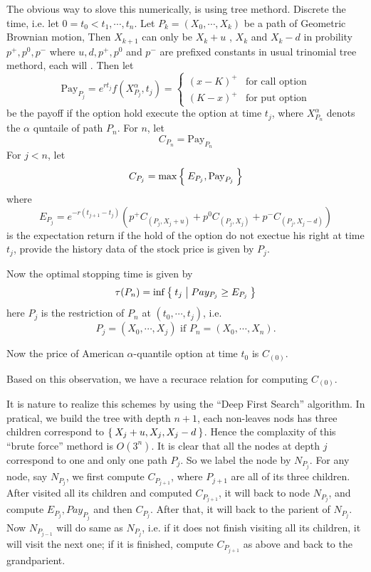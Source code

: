 \documentclass[11pt]{book}
\begin{document}
The obvious way to slove this numerically, is using tree methord. 
Discrete the time, i.e. let $0=t_0< t_1, \cdots, t_n$.
Let $P_k=(X_0, \cdots, X_k)$ be a path of Geometric Brownian motion, 
Then $X_{k+1}$ can only be $X_{k}+u$ , $X_k$ and $X_{k}-d$ in probility
$p^+,p^0,p^-$  where $u,d,p^+,p^0$ and $p^-$ are prefixed 
constants in usual trinomial tree methord, each will .
Then let 
\[
\mathrm{Pay}_{P_j} = e^{rt_j}f(X_{P_j}^\alpha, t_j)=
\begin{cases}
(x-K)^+ & \text{for call option}\\
(K-x)^+ & \text{for put option}
\end{cases}
\] 
be the payoff if the option hold execute the option at time $t_j$, 
where $X_{P_n}^\alpha$ denots the $\alpha$ quntaile of path $P_n$. 
For $n$, let 
\[
C_{P_n} = \mathrm{Pay}_{P_n}
\]
For $j< n$, 
let 
\[
C_{P_j} = \max\Set{E_{P_j}, \mathrm{Pay}_{P_j}}
\]
where
\[
E_{P_j} = e^{-r(t_{j+1}-t_j)}(p^+C_{(P_j,X_j+u)} + p^0C_{(P_j,X_j)}+ p^-C_{(P_j,X_j-d)})
\]
is the expectation return if the hold of the option
do not exectue his right at time $t_j$, provide the history data of 
the stock price is given by $P_j$. 

Now the optimal stopping time is given by 
\[
\tau(P_n) = \inf\Set{t_j| Pay_{P_j}\geq E_{P_j}}
\]
here $P_j$ is the restriction of $P_n$ at $(t_0, \cdots, t_j)$, i.e. 
\[
P_j = (X_0, \cdots, X_j) \text{ if } P_n=(X_0, \cdots, X_n). 
\] 

Now the price of American $\alpha$-quantile option at time $t_0$ is $C_{(0)}$.

Based on this observation, we have a recurace relation for computing $C_{(0)}$.

It is nature to realize this schemes by using the
``Deep First Search'' algorithm. 
In pratical, we build the tree with depth $n+1$, each non-leaves nods has three
children correspond to $\Set{X_j+u,X_j, X_j-d}$. Hence the complaxity of this 
``brute force'' methord is $O(3^n)$. 
It is clear that all the nodes at depth $j$ correspond to one and only one path
$P_j$. So we label the node by $N_{P_j}$. 
For any node, say $N_{P_j}$, we first compute $C_{P_{j+1}}$, where $P_{j+1}$ are 
all of its three children. 
After visited all its children and computed $C_{P_{j+1}}$, it will back to 
node $N_{P_j}$, and compute $E_{P_j}, Pay_{P_j}$ and then $C_{P_j}$. After that, 
it will back to the parient of $N_{P_j}$. Now $N_{P_{j-1}}$ will do same as 
$N_{P_{j}}$, i.e. if it does not finish visiting all its children,
 it will visit the next one; if it is finished, compute $C_{P_{j+1}}$ as above 
and back to the grandparient. 
\end{document}
